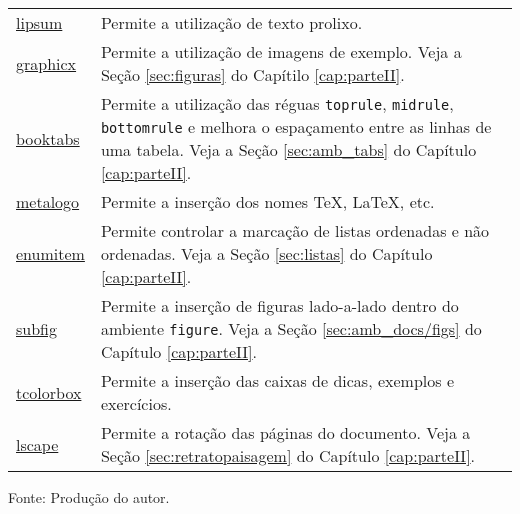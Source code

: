 \begin{longtable}{@{\extracolsep{\fill}}p{2cm} p{12cm}}
\href{https://www.ctan.org/pkg/lipsum}{lipsum} & Permite a utilização de texto prolixo. \\
\href{https://www.ctan.org/pkg/graphicx}{graphicx} & Permite a utilização de imagens de exemplo. Veja a Seção \ref{sec:figuras} do Capítilo \ref{cap:parteII}. \\
\href{https://www.ctan.org/pkg/booktabs}{booktabs} & Permite a utilização das réguas {\tt toprule}, {\tt midrule}, {\tt bottomrule} e melhora o espaçamento entre as linhas de uma tabela. Veja a Seção \ref{sec:amb_tabs} do Capítulo \ref{cap:parteII}. \\
\href{https://www.ctan.org/pkg/metalogo}{metalogo} & Permite a inserção dos nomes \TeX{}, \LaTeX{}, \XeLaTeX{} etc. \\
\href{https://www.ctan.org/pkg/enumitem}{enumitem} & Permite controlar a marcação de listas ordenadas e não ordenadas. Veja a Seção \ref{sec:listas} do Capítulo \ref{cap:parteII}. \\
\href{https://www.ctan.org/pkg/subfig}{subfig}  & Permite a inserção de figuras lado-a-lado dentro do ambiente {\tt figure}. Veja a Seção \ref{sec:amb_docs/figs} do Capítulo \ref{cap:parteII}. \\
\href{https://www.ctan.org/pkg/tcolorbox}{tcolorbox} & Permite a inserção das caixas de dicas, exemplos e exercícios. \\
\href{https://www.ctan.org/pkg/lscape}{lscape} & Permite a rotação das páginas do documento. Veja a Seção \ref{sec:retratopaisagem} do Capítulo \ref{cap:parteII}. \\
\end{longtable}
\vspace{-8mm}
\begin{center}
	Fonte: Produção do autor.
\end{center}
